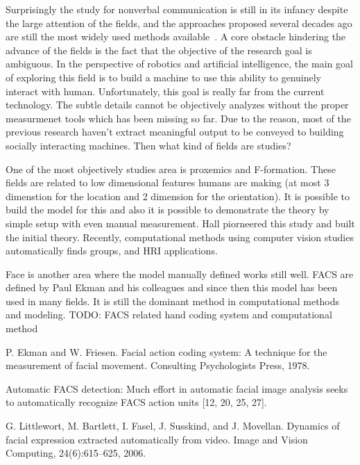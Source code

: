 Surprisingly the study for nonverbal communication is still in its infancy despite the large attention of the fields, and the approaches proposed several decades ago are still the most widely used methods available~\cite{Moore13}. A core obstacle hindering the advance of the fields is the fact that the objective of the research goal is ambiguous. In the perspective of robotics and artificial intelligence, the main goal of exploring this field is to build a machine to use this ability to genuinely interact with human. Unfortunately, this goal is really far from the current technology. The subtle details cannot be objectively analyzes without the proper measurmenet tools which has been missing so far. Due to the reason, most of the previous research haven't extract meaningful output to be conveyed to building socially interacting machines. Then what kind of fields are  studies?



One of the most objectively studies area is proxemics and F-formation. These fields are related to low dimensional features humans are making (at most 3 dimenstion for the location and  2 dimension for the orientation). It is possible to build the model for this and also it is possible to demonstrate the theory  by simple setup with even manual measurement. Hall piorneered this study and built the initial theory. Recently, computational methods using computer vision studies automatically finds groups, and HRI applications. 




Face is another area where the model manually defined works still well. FACS are defined by Paul Ekman and his colleagues and since then this model has been used in many fields.  It is still the dominant method in computational methods and modeling.  TODO: FACS related hand coding system and computational method





P. Ekman and W. Friesen. Facial action coding system: A
technique for the measurement of facial movement. Consulting
Psychologists Press, 1978.




Automatic FACS detection:
Much effort
in automatic facial image analysis seeks to automatically
recognize FACS action units [12, 20, 25, 27].

G. Littlewort, M. Bartlett, I. Fasel, J. Susskind, and J. Movellan.
Dynamics of facial expression extracted automatically
from video. Image and Vision Computing, 24(6):615–625,
2006.

